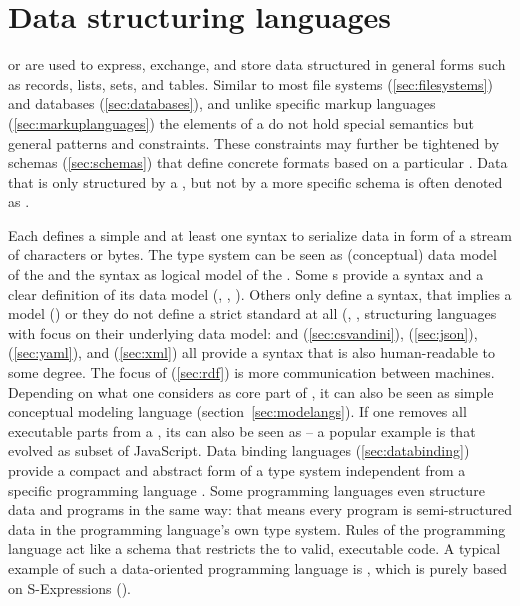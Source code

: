 \section{Data structuring languages}
\label{sec:dsl}

or  are used to express, exchange, and store
data structured in general forms such as records, lists, sets, and
tables. Similar to most file systems (\ref{sec:filesystems}) and 
databases (\ref{sec:databases}), and unlike specific markup languages 
(\ref{sec:markuplanguages}) the elements of a  do not
hold special semantics but general patterns and constraints. These
constraints may further be tightened by schemas (\ref{sec:schemas})
that define concrete formats based on a particular .
Data that is only structured by a , but not by a more
specific schema is often denoted as .

Each  defines a simple  and at least one syntax to
serialize data in form of a stream of characters or bytes. The type system can
be seen as (conceptual) data model of the  and the syntax as logical
model of the . Some s provide a syntax and a clear
definition of its data model (, , ).  Others
only define a syntax, that implies a model () or they do not define
a strict standard at all (, ,
structuring languages with focus on their underlying data model:  and
 (\ref{sec:csvandini}),  (\ref{sec:json}), 
(\ref{sec:yaml}), and  (\ref{sec:xml}) all provide a syntax that is
also human-readable to some degree. The focus of  (\ref{sec:rdf}) is
more communication between machines. Depending on what one considers as core
part of , it can also be seen as simple conceptual modeling language
(section~\ref{sec:modelangs}).
If one removes all executable parts from a , its
 can also be seen as  -- a popular example is
 that evolved as subset of JavaScript. Data binding languages
(\ref{sec:databinding}) provide a compact and abstract form of a type system
independent from a specific programming language . Some programming languages
even structure data and programs in the same way: that means every program is
semi-structured data in the programming language's own type system.  Rules of
the programming language act like a schema that restricts the  to
valid, executable code. A typical example of such a data-oriented programming
language is , which is purely based on S-Expressions ().


